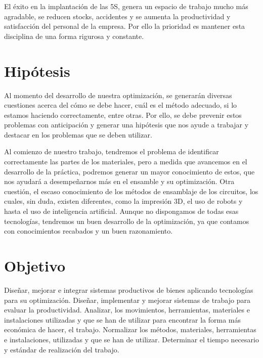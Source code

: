     El éxito en la implantación de las 5S, genera un espacio de trabajo mucho más agradable, se reducen stocks, accidentes y se aumenta la productividad y satisfacción del personal de la empresa. Por ello la prioridad es mantener esta disciplina de una forma rigurosa y constante.
    \cite{justo}
    
    
    
    
    
    
    \section{Hipótesis}
    
    Al momento del desarrollo de nuestra optimización, se generarán diversas cuestiones acerca del cómo se debe hacer, cuál es el método adecuado, si lo estamos haciendo correctamente, entre otras. Por ello, se debe prevenir estos problemas con anticipación y generar una hipótesis que nos ayude a trabajar y destacar en los problemas que se deben utilizar.
    
    Al comienzo de nuestro trabajo, tendremos el problema de identificar correctamente las partes de los materiales, pero a medida que avancemos en el desarrollo de la práctica, podremos generar un mayor conocimiento de estos, que nos ayudará a desempeñarnos más en el ensamble y su optimización.
    Otra cuestión, el escaso conocimiento de los métodos de ensamblaje de los circuitos, los cuales, sin duda, existen diferentes, como la impresión 3D, el uso de robots y hasta el uso de inteligencia artificial. Aunque no dispongamos de todas esas tecnologías, tendremos un buen desarrollo de la optimización, ya que contamos con conocimientos recabados y un buen razonamiento.
    
    
    \section{Objetivo}
    
    Diseñar, mejorar e integrar sistemas productivos de bienes aplicando tecnologías para su optimización. Diseñar, implementar y mejorar sistemas de trabajo para evaluar la productividad. Analizar, los movimientos, herramientas, materiales e instalaciones utilizadas y que se han de utilizar para encontrar la forma más económica de hacer, el trabajo. Normalizar los métodos, materiales, herramientas e instalaciones, utilizadas y que se han de utilizar. Determinar el tiempo necesario y estándar de realización del trabajo.
    
